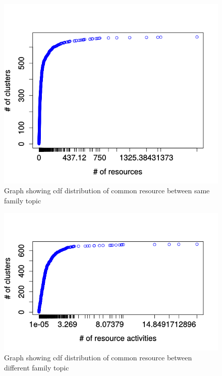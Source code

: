 \begin{figure}[htbp]
\begin{center}
  \includegraphics[scale=0.7]{figures/intra_clustered_common.png}
\end{center}
\captionsetup{font=small}
\caption{ Graph showing cdf distribution of common resource between same family topic}
\label{fig:intraclustcommon}
\end{figure}
\begin{figure}[htbp]
\begin{center}
  \includegraphics[scale=0.7]{figures/inter_clustered_common.png}
\end{center}
\captionsetup{font=small}
\caption{Graph showing cdf distribution of common resource between different family topic}
\label{fig:interclustcommon}
\end{figure}

